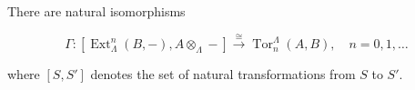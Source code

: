There are natural isomorphisms

$$\Gamma : [\operatorname{Ext}_\Lambda^n(B, -), A \otimes_\Lambda -] \xrightarrow{\cong} \operatorname{Tor}_n^\Lambda(A, B), \quad n = 0, 1, \dots$$

where $[S, S']$ denotes the set of natural transformations from $S$ to $S'$.
